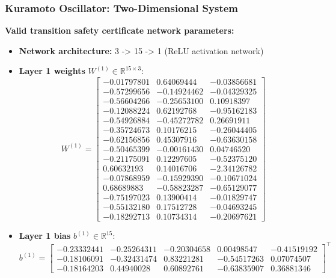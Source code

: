 	\subsubsection{Kuramoto Oscillator: Two-Dimensional System}
	\label{app:ko2d_neural}
	
	\textbf{Valid transition safety certificate network parameters:}
	
	\begin{itemize}
	    \item \textbf{Network architecture:} 3 -> 15 -> 1 (ReLU activation network)
	    \item \textbf{Layer 1 weights} $W^{(1)} \in \mathbb{R}^{15 \times 3}$:
	    {\footnotesize
	    \[
	    W^{(1)} = \begin{bmatrix}
	    -0.01797801 &  0.64069444 & -0.03856681 \\
	    -0.57299656 & -0.14924462 & -0.04329325 \\
	    -0.56604266 & -0.25653100 &  0.10918397 \\
	    -0.12088224 &  0.62192768 & -0.95162183 \\
	    -0.54926884 & -0.45272782 &  0.26691911 \\
	    -0.35724673 &  0.10176215 & -0.26044405 \\
	    -0.62156856 &  0.45307916 & -0.63630158 \\
	    -0.50465399 & -0.00161430 &  0.04746520 \\
	    -0.21175091 &  0.12297605 & -0.52375120 \\
	     0.60632193 &  0.14016706 & -2.34126782 \\
	    -0.07868959 & -0.15929390 & -0.10671024 \\
	     0.68689883 & -0.58823287 & -0.65129077 \\
	    -0.75197023 &  0.13900414 & -0.01829747 \\
	    -0.55132180 &  0.17512728 & -0.04693245 \\
	    -0.18292713 &  0.10734314 & -0.20697621
	    \end{bmatrix}
	    \]}
	    
	    \item \textbf{Layer 1 bias} $b^{(1)} \in \mathbb{R}^{15}$:
	    {\scriptsize
	    \[
	    b^{(1)} = \begin{bmatrix}
	    -0.23332441 & -0.25264311 & -0.20304658 &  0.00498547 & -0.41519192 \\
	    -0.18106091 & -0.32431474 &  0.83221281 & -0.54517263 &  0.07074507 \\
	    -0.18164203 &  0.44940028 &  0.60892761 & -0.63835907 &  0.36881346
	    \end{bmatrix}^\top
	    \]}
	    

\end{itemize}
